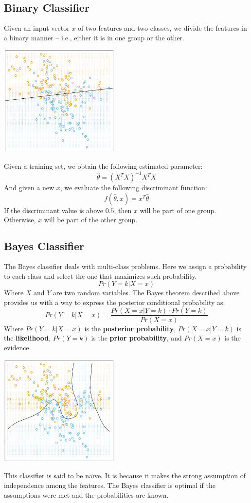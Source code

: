 \documentclass{article}
\begin{document}
\subsection{Binary Classifier}
Given an input vector $x$ of two features and two classes, we divide the features in a binary manner -- i.e., either it is in one group or the other.

\begin{center}
	\includegraphics[width=6cm]{binary_classification.png}
\end{center}
Given a training set, we obtain the following estimated parameter:
\[ \hat\theta = (X^TX)^{-1}X^TX \]
And given a new $x$, we evaluate the following discriminant function:
\[ f(\hat\theta, x) = x^T\hat\theta \]
If the discriminant value is above $0.5$, then $x$ will be part of one group. Otherwise, $x$ will be part of the other group.

\subsection{Bayes Classifier}
The Bayes classifier deals with multi-class problems. Here we assign a probability to each class and select the one that maximizes such probability.
\[ Pr(Y = k|X = x) \]
Where $X$ and $Y$ are two random variables. The Bayes theorem described above provides us with a way to express the posterior conditional probability as:
\[ Pr(Y = k|X = x) = \frac{Pr(X = x|Y = k) \cdot Pr(Y = k)}{Pr(X = x)} \]
Where $Pr(Y = k|X = x)$ is the \textbf{posterior probability}, $Pr(X = x|Y = k)$ is the \textbf{likelihood}, $Pr(Y = k)$ is the \textbf{prior probability}, and $Pr(X = x)$ is the evidence.

\begin{center}
	\includegraphics[width=6cm]{bayes_classification.png}
\end{center}
This classifier is said to be na\"ive. It is because it makes the strong assumption of independence among the features. The Bayes classifier is optimal if the assumptions were met and the probabilities are known.
\end{document}
